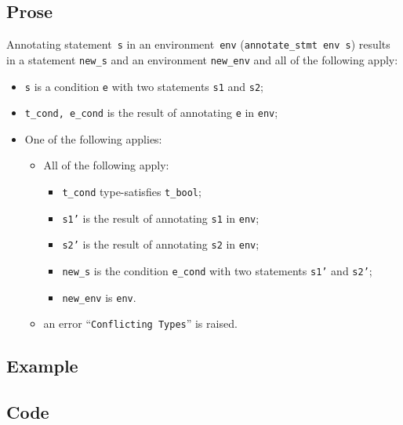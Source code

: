 \documentclass{book}
\begin{document}
  \subsection{Prose}
Annotating statement~\texttt{s} in an environment~\texttt{env}
(\texttt{annotate\_stmt env s}) results in a statement \texttt{new\_s} and an
environment \texttt{new\_env} and all of the following apply:
   \begin{itemize}
   \item \texttt{s} is a condition \texttt{e} with two statements \texttt{s1} and \texttt{s2};
   \item \texttt{t\_cond, e\_cond} is the result of annotating \texttt{e} in \texttt{env};
   \item One of the following applies:
     \begin{itemize}
     \item All of the following apply:
       \begin{itemize}
       \item \texttt{t\_cond} type-satisfies \texttt{t\_bool};
       \item \texttt{s1'} is the result of annotating \texttt{s1} in \texttt{env};
       \item \texttt{s2'} is the result of annotating \texttt{s2} in \texttt{env};
       \item \texttt{new\_s} is the condition \texttt{e\_cond} with two statements \texttt{s1'} and \texttt{s2'};
       \item \texttt{new\_env} is \texttt{env}.
       \end{itemize}
     \item an error ``\texttt{Conflicting Types}'' is raised.
     \end{itemize}
   \end{itemize}

  \subsection{Example}

  \subsection{Code}
\end{document}
